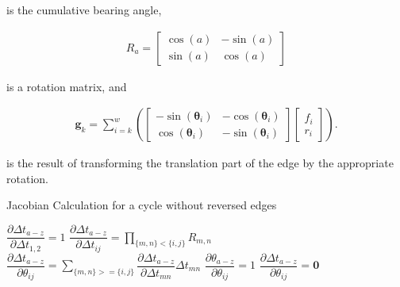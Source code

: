 is the cumulative bearing angle,

\begin{align*}
  R_a = \left[\begin{array}{cc}
  \cos(a) & -\sin(a) \\ \sin(a) & \cos(a)
  \end{array}\right]
\end{align*}

is a rotation matrix, and

\begin{align*}
  \mathbf{g}_k = \sum_{i=k}^{w} \left(\left[\begin{array}{cc}
  -\sin(\boldsymbol{\theta}_i) & -\cos(\boldsymbol{\theta}_i) \\ \cos(\boldsymbol{\theta}_i) & -\sin(\boldsymbol{\theta}_i)
  \end{array}\right]
  \left[\begin{array}{c}
  f_i \\ r_i
  \end{array}\right]\right).
\end{align*}

is the result of transforming the translation part of the edge by the appropriate rotation.

\pagebreak

\begin{algorithm}[H]
  \caption{Jacobian Calculation for a cycle without reversed edges}\label{algo:non_reversed}
  \begin{algorithmic}[1]
    \State $\dfrac{\partial \Delta t_{a-z}}{\partial \Delta t_{1,2}} = 1$
      \State $\dfrac{\partial \Delta t_{a-z}}{\partial \Delta t_{ij}} = \prod_{\{m,n\} < \{i,j\}} R_{m,n}$
    \EndFor
      \State $\dfrac{\partial \Delta t_{a-z}}{\partial \theta_{ij}} = \sum_{\{m,n\} >= \{i,j\}} \dfrac{\partial \Delta t_{a-z}}{\partial \Delta t_{mn}} \Delta t_{mn}$
      \State $\dfrac{\partial \theta_{a-z}}{\partial \theta_{ij}} = 1$
      \State $\dfrac{\partial \Delta t_{a-z}}{\partial \theta_{ij}} = \textbf{0}$
    \EndFor
  \end{algorithmic}
\end{algorithm}

